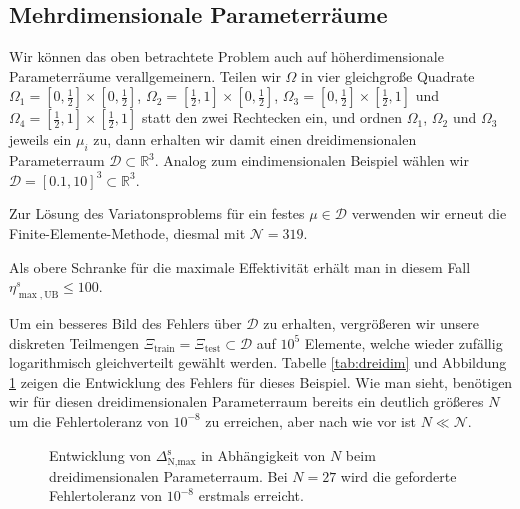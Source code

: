 \subsection{Mehrdimensionale Parameterräume} %
\label{sub:mehrdimensionale_parameterr_ume}

Wir können das oben betrachtete Problem auch auf höherdimensionale Parameterräume verallgemeinern. Teilen wir $\Omega$ in vier gleichgroße Quadrate $\Omega_1 = [0, \frac 12] \times [0, \frac 12]$, $\Omega_2 = [\frac 12, 1] \times [0, \frac 12]$, $\Omega_3 = [0, \frac 12] \times [\frac 12, 1]$ und $\Omega_4 = [\frac 12, 1] \times [\frac 12, 1]$ statt den zwei Rechtecken ein, und ordnen $\Omega_1$, $\Omega_2$ und $\Omega_3$ jeweils ein $\mu_i$ zu, dann erhalten wir damit einen dreidimensionalen Parameterraum $\mathcal D \subset \mathbb{R}^3$. Analog zum eindimensionalen Beispiel wählen wir $\mathcal D = [0.1, 10]^3 \subset \mathbb{R}^3$.

Zur Lösung des Variatonsproblems für ein festes $\mu \in \mathcal D$ verwenden wir erneut die Finite-Elemente-Methode, diesmal mit $\mathcal N = 319$.

Als obere Schranke für die maximale Effektivität erhält man in diesem Fall $\eta^s_{\max,\text{UB}}  \leq 100$.

Um ein besseres Bild des Fehlers über $\mathcal D$ zu erhalten, vergrößeren wir unsere diskreten Teilmengen $\Xi_\text{train} = \Xi_\text{test} \subset \mathcal D$ auf $10^5$ Elemente, welche wieder zufällig logarithmisch gleichverteilt gewählt werden.
Tabelle \ref{tab:dreidim} und Abbildung \ref{fig:3par_plot_fehler_nach_N} zeigen die Entwicklung des Fehlers für dieses Beispiel. Wie man sieht, benötigen wir für diesen dreidimensionalen Parameterraum bereits ein deutlich größeres $N$ um die Fehlertoleranz von $10^{-8}$ zu erreichen, aber nach wie vor ist $N \ll \mathcal N$.

\begin{figure}[h!]
    \begin{center}
        \small
        \setlength\figureheight{5cm}
        \setlength{}
        
    \end{center}
    \caption{Entwicklung von $\Delta{}^\text{s}_{\text{N,max}}$ in Abhängigkeit von $N$ beim dreidimensionalen Parameterraum. Bei $N = 27$ wird die geforderte Fehlertoleranz von $10^{-8}$ erstmals erreicht.}
    \label{fig:3par_plot_fehler_nach_N}
\end{figure}

